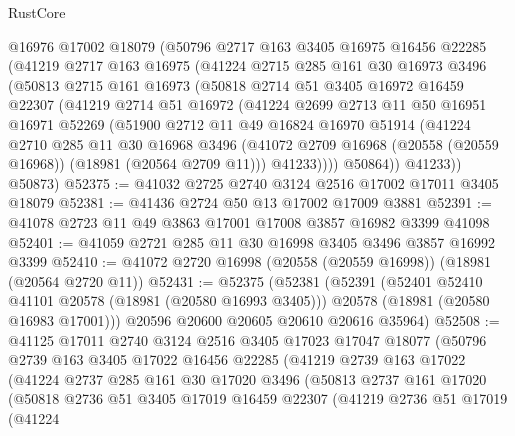 \begin{lexlean}{RustCore}
\begin{coremodule}
    @16976
    @17002
    @18079
    (@50796
      @2717
      @163
      @3405
      @16975
      @16456
      @22285
      (@41219
        @2717
        @163
        @16975
        (@41224
          @2715
          @285
          @161
          @30
          @16973
          @3496
          (@50813
            @2715
            @161
            @16973
            (@50818
              @2714
              @51
              @3405
              @16972
              @16459
              @22307
              (@41219
                @2714
                @51
                @16972
                (@41224
                  @2699
                  @2713
                  @11
                  @50
                  @16951
                  @16971
                  @52269
                  (@51900
                    @2712
                    @11
                    @49
                    @16824
                    @16970
                    @51914
                    (@41224
                      @2710
                      @285
                      @11
                      @30
                      @16968
                      @3496
                      (@41072 @2709 @16968 (@20558 (@20559 @16968)) (@18981 (@20564 @2709 @11)))
                      @41233))))
              @50864))
          @41233))
      @50873)
@52375 := @41032 @2725 @2740 @3124 @2516 @17002 @17011 @3405 @18079
@52381 := @41436 @2724 @50 @13 @17002 @17009 @3881
@52391 := @41078 @2723 @11 @49 @3863 @17001 @17008 @3857 @16982 @3399 @41098
@52401 := @41059 @2721 @285 @11 @30 @16998 @3405 @3496 @3857 @16992 @3399
@52410 := @41072 @2720 @16998 (@20558 (@20559 @16998)) (@18981 (@20564 @2720 @11))
@52431 := @52375
    (@52381
      (@52391
        (@52401 @52410 @41101 @20578 (@18981 (@20580 @16993 @3405)))
        @20578
        (@18981 (@20580 @16983 @17001)))
      @20596
      @20600
      @20605
      @20610
      @20616
      @35964)
@52508 := @41125
    @17011
    @2740
    @3124
    @2516
    @3405
    @17023
    @17047
    @18077
    (@50796
      @2739
      @163
      @3405
      @17022
      @16456
      @22285
      (@41219
        @2739
        @163
        @17022
        (@41224
          @2737
          @285
          @161
          @30
          @17020
          @3496
          (@50813
            @2737
            @161
            @17020
            (@50818
              @2736
              @51
              @3405
              @17019
              @16459
              @22307
              (@41219
                @2736
                @51
                @17019
                (@41224

\end{coremodule}
\end{lexlean}
